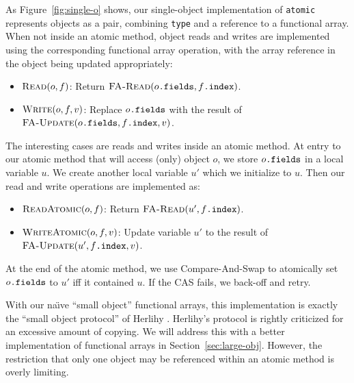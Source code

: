 \documentclass{csa-sig-alternate}
\newcommand{\atomic}{\texttt{atomic}\xspace}
\newcommand{\funcname}[1]{\ensuremath{\text{\sc #1}}}
\newcommand{\fref}[2]{\ensuremath{#1\text{\tt .#2}}}
\begin{document}
{As Figure~\ref{fig:single-o} shows, our single-object implementation
of \atomic represents objects as a pair, combining {\tt type} and a
reference to a functional array.  When not inside an atomic
method, object reads and writes are implemented using the
corresponding functional array operation, with the array reference in
the object being updated appropriately:
\begin{itemize}
\item $\funcname{Read}(o, f)$:
  Return $\funcname{FA-Read}(\fref{o}{fields}, \fref{f}{index})$.
\item $\funcname{Write}(o, f, v)$: Replace \fref{o}{fields} with the
  result of $\funcname{FA-Update}(\fref{o}{fields}, \fref{f}{index}, v)$.
\end{itemize}

The interesting cases are reads and writes inside an atomic method.
At entry to our atomic method that will access (only) object $o$, we
store \fref{o}{fields} in a local variable $u$.  We create another
local variable $u'$ which we initialize to $u$.  Then our read and
write operations are implemented as:
\begin{itemize}
\item $\funcname{ReadAtomic}(o, f)$:
  Return $\funcname{FA-Read}(u', \fref{f}{index})$.
\item $\funcname{WriteAtomic}(o, f, v)$:
  Update variable $u'$ to the result of
  $\funcname{FA-Update}(u', \fref{f}{index}, v)$.
\end{itemize}

At the end of the atomic method, we use Compare-And-Swap to atomically
set \fref{o}{fields} to $u'$ iff it contained $u$.  If the CAS fails,
we back-off and retry.

With our na{\"\i}ve ``small object'' functional arrays, this implementation is
exactly the ``small object protocol'' of Herlihy \cite{Herlihy93}.
Herlihy's protocol is rightly criticized for an excessive amount of
copying.  We will address this with a better implementation of
functional arrays in Section~\ref{sec:large-obj}.
However, the restriction that only one object
may be referenced within an atomic method is overly limiting.

}
\end{document}
